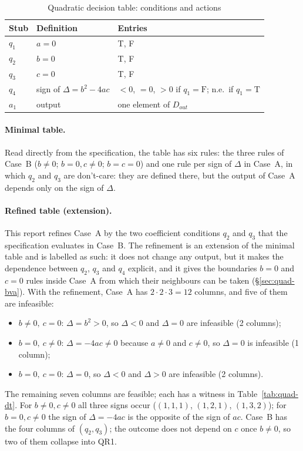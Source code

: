 \documentclass[11pt,a4paper]{article}
\begin{document}
\begin{table}[H]
\centering
\caption{Quadratic decision table: conditions and actions}
\label{tab:quad-conditions}
\small
\begin{tabularx}{\textwidth}{l l Y}
\toprule
Stub & Definition & Entries \\
\midrule
\(q_1\) & \(a=0\) & T, F \\
\(q_2\) & \(b=0\) & T, F \\
\(q_3\) & \(c=0\) & T, F \\
\(q_4\) & sign of \(\Delta=b^2-4ac\) & \(<0\), \(=0\), \(>0\) if \(q_1=\mathrm{F}\); n.e.\ if \(q_1=\mathrm{T}\) \\
\midrule
\(a_1\) & output & one element of \(D_{out}\) \\
\bottomrule
\end{tabularx}
\end{table}

\paragraph{Minimal table.} Read directly from the specification, the table
has six rules: the three rules of Case~B (\(b\ne0\); \(b=0,c\ne0\);
\(b=c=0\)) and one rule per sign of \(\Delta\) in Case~A, in which \(q_2\)
and \(q_3\) are don't-care: they are defined there, but the output of Case~A depends only on the sign of \(\Delta\).

\paragraph{Refined table (extension).} This report refines Case~A by the two
coefficient conditions \(q_2\) and \(q_3\) that the specification evaluates
in Case~B. The refinement is an extension of the minimal table and is
labelled as such: it does not change any output, but it makes the dependence
between \(q_2\), \(q_3\) and \(q_4\) explicit, and it gives the boundaries
\(b=0\) and \(c=0\) rules inside Case~A from which their neighbours can be
taken (\S\ref{sec:quad-bva}). With the refinement, Case~A has
\(2\cdot2\cdot3=12\) columns, and five of them are infeasible:
\begin{itemize}
    \item \(b\ne0,\ c=0\): \(\Delta=b^2>0\), so \(\Delta<0\) and \(\Delta=0\) are infeasible (2 columns);
    \item \(b=0,\ c\ne0\): \(\Delta=-4ac\ne0\) because \(a\ne0\) and \(c\ne0\), so \(\Delta=0\) is infeasible (1 column);
    \item \(b=0,\ c=0\): \(\Delta=0\), so \(\Delta<0\) and \(\Delta>0\) are infeasible (2 columns).
\end{itemize}
The remaining seven columns are feasible; each has a witness in
Table~\ref{tab:quad-dt}. For \(b\ne0,c\ne0\) all three signs occur
(\((1,1,1)\), \((1,2,1)\), \((1,3,2)\)); for \(b=0,c\ne0\) the sign of
\(\Delta=-4ac\) is the opposite of the sign of \(ac\). Case~B has the four
columns of \((q_2,q_3)\); the outcome does not depend on \(c\) once
\(b\ne0\), so two of them collapse into QR1.
\end{document}
